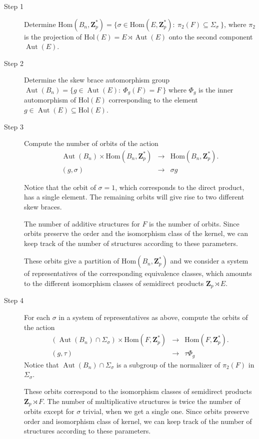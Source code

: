 \documentclass[12pt]{article}
\theoremstyle{definition}
\newcommand{\Z}{\mathbf Z}
\newcommand{\Hol}{\mathrm{Hol}}
\newcommand{\Hom}{\mathrm{Hom}}
\newcommand{\Aut}{\operatorname{Aut}}
\begin{document}
	\begin{description}
		
		\item[Step 1] Determine
		$
		\Hom(B_n,\Z_p^*)=\{\sigma\in \Hom(E,\Z_p^*) : \  \pi_2(F)\subseteq \Sigma_{\sigma}\ \}
		$, where $\pi_2$ is the projection of $\Hol(E)=E\rtimes \Aut(E)$ onto the second component $\Aut(E)$.
		
		\item[Step 2] Determine the skew brace automorphism group
		$
		\Aut(B_n)=\{g\in\Aut(E) : \  \Phi_g(F)=F\ \}
		$
        where $\Phi_g$ is the inner automorphism of $\Hol(E)$ corresponding to the element $g\in\Aut(E)\subseteq \Hol(E)$.
		
		\item[Step 3] Compute the number of orbits of the action
		$$
		\begin{array}{ccc}
		\Aut(B_n) \times \Hom(B_n,\Z_p^*)  &\longrightarrow&  \Hom(B_n,\Z_p^*). \\
		(g, \sigma) &\longrightarrow & \sigma g
		\end{array}
		$$
		
		Notice that the orbit of $\sigma=1$, which corresponds to the direct product,  has a single element. The remaining orbits will give rise to two different skew braces.
		
		The number of additive structures for $F$ is the number of orbits.
		Since orbits preserve the order and the isomorphism class of the kernel, we can keep track of the number of structures according to these parameters.

These orbits give a partition of $\Hom(B_n,\Z_p^*)$ and we consider a system of representatives of the corresponding equivalence classes, which amounts to the different isomorphism classes of semidirect products $\Z_p\rtimes E$.
        
		\item[Step 4] For each $\sigma$ in a system of representatives as above, compute the orbits of the action
		$$
		\begin{array}{ccc}
		( \Aut(B_n)\cap \Sigma_{\sigma}) \times \Hom(F,\Z_p^*) &\longrightarrow&  \Hom(F,\Z_p^*). \\
		(g, \tau) &\longrightarrow & \tau\Phi_g
		\end{array}
		$$
        Notice that  $\Aut(B_n)\cap \Sigma_{\sigma}$ is a subgroup of the normalizer of $\pi_2(F)$ in
		$\Sigma_{\sigma}$.

        These orbits correspond to the isomorphism classes of semidirect products $\Z_p\rtimes F$.
		The number of multiplicative structures  is twice the number of orbits except for $\sigma$ trivial, when we get a single one.
		Since orbits preserve order and isomorphism class of kernel, we can keep track of the number of structures according to these parameters.
	\end{description}
	
\end{document}
